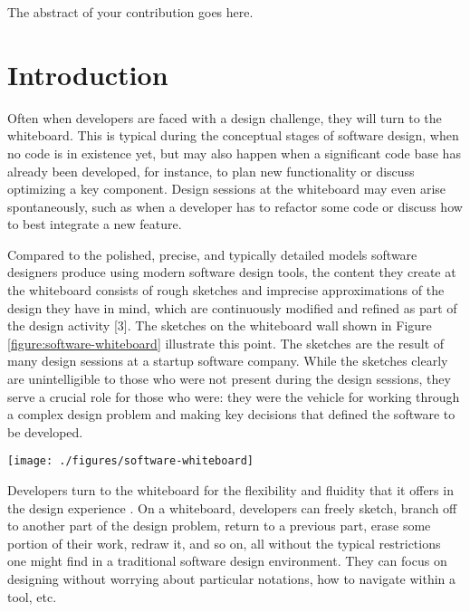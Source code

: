 \documentclass[12pt,fleqn]{ucithesis}
\begin{document}
\thesisabstract
{
  The abstract of your contribution goes here.
}



\preliminarypages

 \newpage \chapter{Introduction}
\label{chapter:introduction}

Often when developers are faced with a design challenge, they will turn to the whiteboard.  This is typical during the conceptual stages of software design, when no code is in existence yet, but may also happen when a significant code base has already been developed, for instance, to plan new functionality or discuss optimizing a key component. Design sessions at the whiteboard may even arise spontaneously, such as when a developer has to refactor some code or discuss how to best integrate a new feature.

Compared to the polished, precise, and typically detailed models software designers produce using modern software design tools, the content they create at the whiteboard consists of rough sketches and imprecise approximations of the design they have in mind, which are continuously modified and refined as part of the design activity [3]. The sketches on the whiteboard wall shown in Figure \ref{figure:software-whiteboard} illustrate this point. The sketches are the result of many design sessions at a startup software company. While the sketches clearly are unintelligible to those who were not present during the design sessions, they serve a crucial role for those who were: they were the vehicle for working through a complex design problem and making key decisions that defined the software to be developed.

\begin{figure*}[tbh]
  \centering
  \texttt{[image: ./figures/software-whiteboard]}
  \caption{Whiteboard wall at a startup company.}
  \label{figure:software-whiteboard}
\end{figure*}

Developers turn to the whiteboard for the flexibility and fluidity that it offers in the design experience \cite{cherubini2007let}. On a whiteboard, developers can freely sketch, branch off to another part of the design problem, return to a previous part, erase some portion of their work, redraw it, and so on, all without the typical restrictions one might find in a traditional software design environment. They can focus on designing without worrying about particular notations, how to navigate within a tool, etc.
\end{document}
